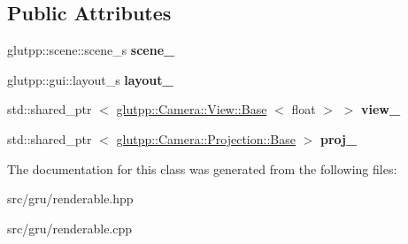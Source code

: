 \subsection*{\-Public \-Attributes}
\begin{DoxyCompactItemize}
\item 
\hypertarget{classglutpp_1_1renderable_a0ef0de3f255d8f8e249ba797609b6dc8}{glutpp\-::scene\-::scene\-\_\-s {\bfseries scene\-\_\-}}\label{classglutpp_1_1renderable_a0ef0de3f255d8f8e249ba797609b6dc8}

\item 
\hypertarget{classglutpp_1_1renderable_a9f2091a43a07d3f8404e89abb578f94f}{glutpp\-::gui\-::layout\-\_\-s {\bfseries layout\-\_\-}}\label{classglutpp_1_1renderable_a9f2091a43a07d3f8404e89abb578f94f}

\item 
\hypertarget{classglutpp_1_1renderable_a686f3edea2d0b8185af7b7a4980c963c}{std\-::shared\-\_\-ptr\*
$<$ \hyperlink{classglutpp_1_1Camera_1_1View_1_1Base}{glutpp\-::\-Camera\-::\-View\-::\-Base}\*
$<$ float $>$ $>$ {\bfseries view\-\_\-}}\label{classglutpp_1_1renderable_a686f3edea2d0b8185af7b7a4980c963c}

\item 
\hypertarget{classglutpp_1_1renderable_abec5a61663b6052169f2bd8fe9611b90}{std\-::shared\-\_\-ptr\*
$<$ \hyperlink{classglutpp_1_1Camera_1_1Projection_1_1Base}{glutpp\-::\-Camera\-::\-Projection\-::\-Base} $>$ {\bfseries proj\-\_\-}}\label{classglutpp_1_1renderable_abec5a61663b6052169f2bd8fe9611b90}

\end{DoxyCompactItemize}


\-The documentation for this class was generated from the following files\-:\begin{DoxyCompactItemize}
\item 
src/gru/renderable.\-hpp\item 
src/gru/renderable.\-cpp\end{DoxyCompactItemize}

